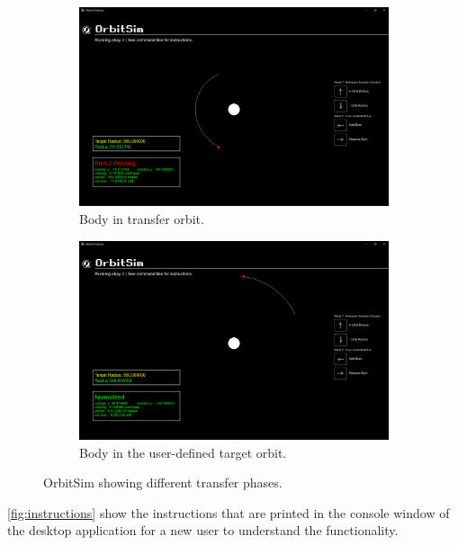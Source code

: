 \documentclass[12pt, letter]{article}
\begin{document}
\begin{figure}[H]
  \centering
  \begin{subfigure}{0.49\linewidth}
    \includegraphics[width=\linewidth]{figures/transfer_state.png}
    \caption{Body in transfer orbit.}
    \label{fig:transfer_orbit}
  \end{subfigure}
  \hfill
  \begin{subfigure}{0.49\linewidth}
    \includegraphics[width=\linewidth]{figures/final_state.png}
    \caption{Body in the user-defined target orbit.}
    \label{fig:target_orbit}
  \end{subfigure}
  

  \caption{OrbitSim showing different transfer phases.}
  \label{fig:stages}
\end{figure}

\autoref{fig:instructions} show the instructions that are printed in the console window of the desktop application for a new user to understand the functionality.
\end{document}
